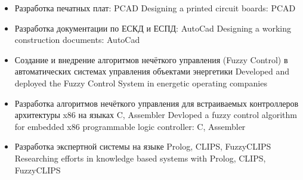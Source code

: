 \documentclass[11pt,a4paper,sans, russian]{moderncv}        %
\begin{document}
{\begin{itemize}
		{Разработка электрических принципиальных схем: PCAD}
		{Designed a schematic circuit diagrams: PCAD}
	\item {}
		{Разработка печатных плат: PCAD}
		{Designing a printed circuit boards: PCAD}
	\item {}
		{Разработка документации по ЕСКД и ЕСПД: AutoCad}
		{Designing a working construction documents: AutoCad}
	\item {}
		{Создание и внедрение алгоритмов нечёткого управления (Fuzzy Control) в автоматических системах управления объектами энергетики}
		{Developed and deployed the Fuzzy Control System in energetic operating companies}
	\item {}
		{Разработка алгоритмов нечёткого управления для встраиваемых контроллеров архитектуры x86 на языках C, Assembler}
		{Devloped a fuzzy control algorithm for embedded x86 programmable logic controller: C, Assembler}
	\item {}
		{Разработка экспертной системы на языке Prolog, CLIPS, FuzzyCLIPS}
		{Researching efforts in knowledge based systems with Prolog, CLIPS, FuzzyCLIPS}	
\end{itemize}
}

\pagebreak


{}
{}
{}
{}

\end{document}

